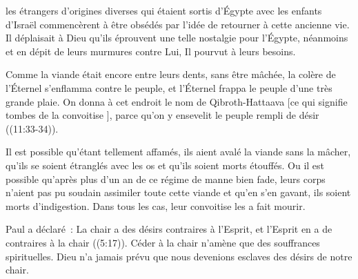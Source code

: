 \dvrule






 les étrangers d'origines diverses qui étaient sortis d'Égypte
 avec les enfants d'Israël commencèrent à être obsédés
 par l'idée de retourner à cette ancienne vie.
 Il déplaisait à Dieu qu'ils éprouvent une telle nostalgie pour l'Égypte,
 néanmoins et en dépit de leurs murmures contre Lui, Il pourvut à leurs besoins.

\og Comme la viande était encore entre leurs dents, sans être mâchée,
 la colère de l'Éternel s'enflamma contre le peuple, et l'Éternel
 frappa le peuple d'une très grande plaie.
 On donna à cet endroit le nom de Qibroth-Hattaava
 [ce qui signifie \og tombes de la convoitise \fg{}],
 parce qu'on y ensevelit le peuple rempli de désir \fg{}
 ((11:33-34)).

Il est possible qu'étant tellement affamés,
 ils aient avalé la viande sans la mâcher,
 qu'ils se soient étranglés avec les os et qu'ils soient morts étouffés.
 Ou il est possible qu'après plus d'un an de ce régime de manne bien fade,
 leurs corps n'aient pas pu soudain assimiler toute cette viande
 et qu'en s'en gavant, ils soient morts d'indigestion.
 Dans tous les cas, leur convoitise les a fait mourir.


Paul a déclaré~:
 \og La chair a des désirs contraires à l'Esprit,
 et l'Esprit en a de contraires à la chair \fg{} ((5:17)).
 Céder à la chair n'amène que des souffrances spirituelles.
 Dieu n'a jamais prévu que nous devenions esclaves des désirs de notre chair.

\dvrule



